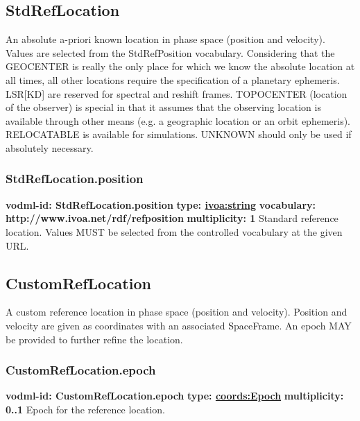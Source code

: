   \subsection{StdRefLocation}
  \label{sect:StdRefLocation}
    An absolute a-priori known location in phase space (position and velocity). Values are selected from the StdRefPosition vocabulary. Considering that the GEOCENTER is really the only place for which we know the absolute location at all times, all other locations require the specification of a planetary ephemeris. LSR[KD] are reserved for spectral and reshift frames. TOPOCENTER (location of the observer) is special in that it assumes that the observing location is available through other means (e.g. a geographic location or an orbit ephemeris). RELOCATABLE is available for simulations. UNKNOWN should only be used if absolutely necessary.

    \subsubsection{StdRefLocation.position}
      \textbf{vodml-id: StdRefLocation.position} \newline
      \textbf{type: \hyperref[sect:ivoa]{ivoa:string}} \newline
      \textbf{vocabulary: http://www.ivoa.net/rdf/refposition} \newline
      \textbf{multiplicity: 1} \newline
      Standard reference location. Values MUST be selected from the controlled vocabulary at the given URL.


  \subsection{CustomRefLocation}
  \label{sect:CustomRefLocation}
    A custom reference location in phase space (position and velocity). Position and velocity are given as coordinates with an associated SpaceFrame. An epoch MAY be provided to further refine the location.

    \subsubsection{CustomRefLocation.epoch}
      \textbf{vodml-id: CustomRefLocation.epoch} \newline
      \textbf{type: \hyperref[sect:Epoch]{coords:Epoch}} \newline
      \textbf{multiplicity: 0..1} \newline 
      Epoch for the reference location.

